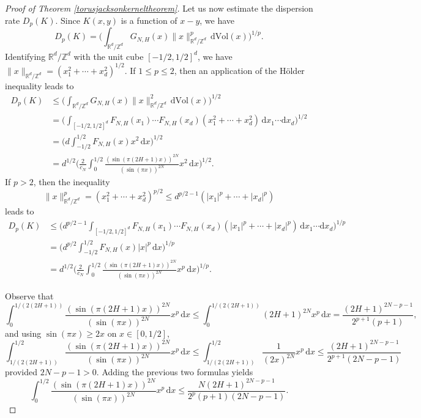 \documentclass[11pt,a4paper]{article}
\theoremstyle{definition}
\begin{document}
\begin{proof}[Proof of Theorem \ref{torusjacksonkerneltheorem}]
Let us now estimate the dispersion rate $D_p(K)$. Since $K(x,y)$ is a function of $x-y$, we have
\[ D_p (K)= \Bigg( \int_{\mathbb{R}^d / \mathbb{Z}^d} G_{N,H} (x) \| x \|_{\mathbb{R}^d / \mathbb{Z}^d}^p \, \mathrm{d}\mathrm{Vol}(x) \Bigg)^{1/p} . \]
Identifying $\mathbb{R}^d / \mathbb{Z}^d$ with the unit cube $[-1/2, 1/2]^d$, we have $\| x \|_{\mathbb{R}^d / \mathbb{Z}^d} = (x_1^2+\cdots + x_d^2)^{1/2}$. If $1 \le p \le 2$, then an application of the H\"older inequality leads to
\[ \begin{split} D_p (K) &\le \Bigg( \int_{\mathbb{R}^d / \mathbb{Z}^d} G_{N,H} (x) \| x \|_{\mathbb{R}^d / \mathbb{Z}^d}^2 \, \mathrm{d}\mathrm{Vol}(x) \Bigg)^{1/2} \\ &= \Bigg( \int_{[-1/2, 1/2]^d} F_{N,H} (x_1) \cdots F_{N,H} (x_d) (x_1^2 + \cdots + x_d^2) \, \mathrm{d}x_1 \cdots \mathrm{d}x_d \Bigg)^{1/2} \\ &= \Bigg( d \int_{-1/2}^{1/2} F_{N,H}(x) x^2 \, \mathrm{d}x \Bigg)^{1/2} \\ &= d^{1/2} \Bigg( \frac{2}{c_N} \int_0^{1/2} \frac{(\sin (\pi (2H+1)x))^{2N}}{(\sin (\pi x))^{2N}} x^2 \, \mathrm{d}x \Bigg)^{1/2} . \end{split} \]
If $p>2$, then the inequality
\[ \| x \|_{\mathbb{R}^d / \mathbb{Z}^d}^p = (x_1^2 + \cdots + x_d^2)^{p/2} \le d^{p/2-1} (|x_1|^p + \cdots + |x_d|^p) \]
leads to
\[ \begin{split} D_p(K) &\le \Bigg( d^{p/2-1} \int_{[-1/2, 1/2]^d} F_{N,H}(x_1) \cdots F_{N,H}(x_d) (|x_1|^p + \cdots + |x_d|^p) \, \mathrm{d}x_1 \cdots \mathrm{d}x_d \Bigg)^{1/p} \\ &= \Bigg( d^{p/2} \int_{-1/2}^{1/2} F_{N,H}(x) |x|^p \, \mathrm{d}x \Bigg)^{1/p} \\ &= d^{1/2} \Bigg( \frac{2}{c_N} \int_{0}^{1/2} \frac{(\sin(\pi (2H+1)x))^{2N}}{(\sin (\pi x))^{2N}} x^p \, \mathrm{d}x \Bigg)^{1/p} . \end{split} \]

Observe that
\[ \int_{0}^{1/(2(2H+1))} \frac{(\sin(\pi (2H+1)x))^{2N}}{(\sin (\pi x))^{2N}} x^p \, \mathrm{d}x \le \int_{0}^{1/(2(2H+1))} (2H+1)^{2N} x^p \, \mathrm{d}x = \frac{(2H+1)^{2N-p-1}}{2^{p+1} (p+1)}, \]
and using $\sin (\pi x) \ge 2x$ on $x\in [0,1/2]$,
\[ \int_{1/(2(2H+1))}^{1/2} \frac{(\sin(\pi (2H+1)x))^{2N}}{(\sin (\pi x))^{2N}} x^p \, \mathrm{d}x \le \int_{1/(2(2H+1))}^{1/2} \frac{1}{(2x)^{2N}} x^p \, \mathrm{d}x \le \frac{(2H+1)^{2N-p-1}}{2^{p+1} (2N-p-1)} \]
provided $2N-p-1>0$. Adding the previous two formulas yields
\[ \int_{0}^{1/2} \frac{(\sin(\pi (2H+1)x))^{2N}}{(\sin (\pi x))^{2N}} x^p \, \mathrm{d}x \le \frac{N(2H+1)^{2N-p-1}}{2^p (p+1)(2N-p-1)} . \]


\end{proof}
\end{document}
